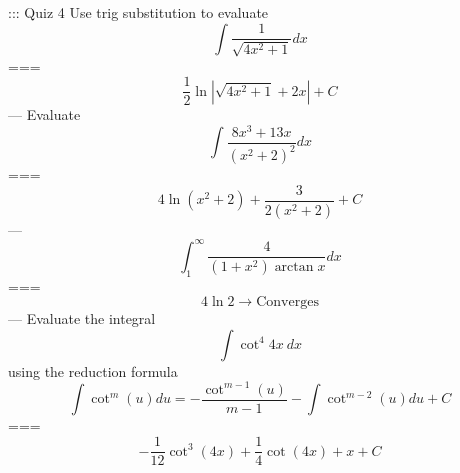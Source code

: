 ::: Quiz 4
Use trig substitution to evaluate
\[\int\frac{1}{\sqrt{4x^2+1}}dx\]
===
\[\frac{1}{2}\ln\left|\sqrt{4x^2+1}+2x\right|+C\]
---
Evaluate
\[\int\frac{8x^3+13x}{{(x^2+2)}^2}dx\]
===
\[4\ln(x^2+2)+\frac{3}{2(x^2+2)}+C\]
---
\[\int_1^\infty\frac{4}{(1+x^2)\arctan x}dx\]
===
\[4\ln 2\rightarrow\text{Converges}\]
---
Evaluate the integral
\[\int\cot^4 4x\ dx\]
using the reduction formula
\begin{displaymath}
\int\cot^m(u)du=-\frac{\cot^{m-1}(u)}{m-1}-\int\cot^{m-2}(u)du+C
\end{displaymath}
===
\[-\frac{1}{12}\cot^3(4x)+\frac{1}{4}\cot(4x)+x+C\]
